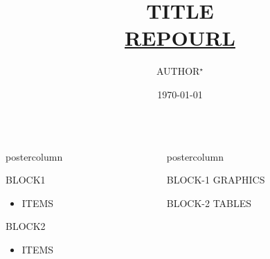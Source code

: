 \documentclass[final,hyperref={pdfpagelabels}]{beamer}
\title[SHORTTITLE]{{\huge TITLE}\\
\url{REPOURL}}
\author[EMAIL]{AUTHOR$^\star$ }
\institute[SHORTAFFILIATION]{$^\star$ AFFILIATION1,AFFILIATION2}
\date{\today}
\newlength{\columnheight}
\begin{document}
\begin{frame}
      \begin{columns}
      \begin{column}{.49\textwidth}
      \begin{beamercolorbox}[center,wd=\textwidth]{postercolumn}
          \begin{minipage}[T]{.95\textwidth}  %
          \parbox[t][\columnheight]{\textwidth}{ %
        \begin{block}{BLOCK1}
            \begin{itemize}
                \item ITEMS
            \end{itemize}
        \end{block}

        \begin{block}{BLOCK2}
            \begin{itemize}
                \item ITEMS
            \end{itemize}
        \end{block}

         }
        \end{minipage}
      \end{beamercolorbox}
  \end{column}

   \begin{column}{.49\textwidth}
      \begin{beamercolorbox}[center,wd=\textwidth]{postercolumn}
        \begin{minipage}[T]{.95\textwidth} %
          \parbox[t][\columnheight]{\textwidth}{ %

        \begin{block}{BLOCK-1}
            GRAPHICS
        \end{block}

        \begin{block}{BLOCK-2}
            TABLES
        \end{block}

         }
        \end{minipage}
      \end{beamercolorbox}
    \end{column}
  \end{columns}

  \end{frame}
\end{document}

